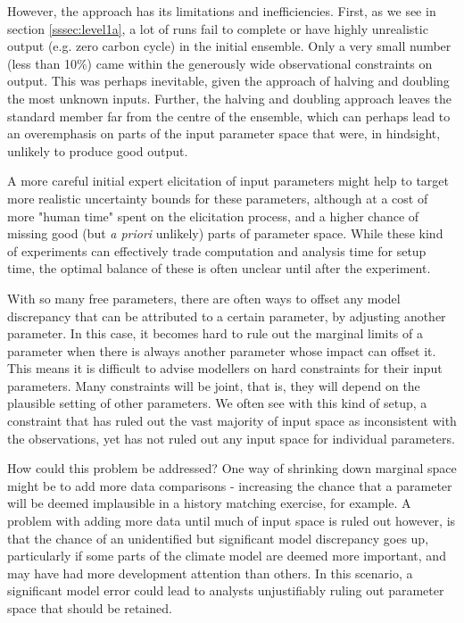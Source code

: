 \documentclass[gmd, manuscript]{copernicus}
\begin{document}
However, the approach has its limitations and inefficiencies. First, as we see in section \ref{sssec:level1a}, a lot of runs fail to complete or have highly unrealistic output (e.g. zero carbon cycle) in the initial ensemble. Only a very small number (less than 10\%) came within the generously wide observational constraints on output.  This was perhaps inevitable, given the approach of halving and doubling the most unknown inputs. Further, the halving and doubling approach leaves the standard member far from the centre of the ensemble, which can perhaps lead to an overemphasis on parts of the input parameter space that were, in hindsight, unlikely to produce good output.

A more careful initial expert elicitation of input parameters might help to target more realistic uncertainty bounds for these parameters, although at a cost of more "human time" spent on the elicitation process, and a higher chance of missing good (but \emph{a priori} unlikely) parts of parameter space. While these kind of experiments can effectively trade computation and analysis time for setup time, the optimal balance of these is often unclear until after the experiment.

With so many free parameters, there are often ways to offset any model discrepancy that can be attributed to a certain parameter, by adjusting another parameter. In this case, it becomes hard to rule out the marginal limits of a parameter when there is always another parameter whose impact can offset it. This means it is difficult to advise modellers on hard constraints for their input parameters. Many constraints will be joint, that is, they will depend on the plausible setting of other parameters. We often see with this kind of setup, a constraint that has ruled out the vast majority of input space as inconsistent with the observations, yet has not ruled out any input space for individual parameters.

How could this problem be addressed? One way of shrinking down marginal space might be to add more data comparisons - increasing the chance that a parameter will be deemed implausible in a history matching exercise, for example. A problem with adding more data until much of input space is ruled out however, is that the chance of an unidentified but significant model discrepancy goes up, particularly if some parts of the climate model are deemed more important, and may have had more development attention than others. In this scenario, a significant model error could lead to analysts unjustifiably ruling out parameter space that should be retained.
\end{document}

